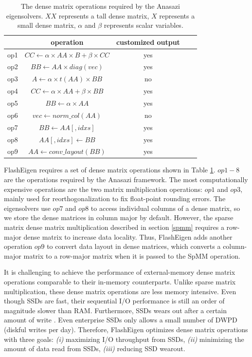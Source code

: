 \begin{table}
	\begin{center}
		\small
		\begin{tabular}{|c|c|c|c|c|}
			\hline
			& operation & customized output \\
			\hline
			op1 & $CC \leftarrow \alpha \times AA \times B + \beta \times CC$ & yes \\
			\hline
			op2 & $BB \leftarrow AA \times diag(vec)$ & yes \\
			\hline
			op3 & $A \leftarrow \alpha \times t(AA) \times BB$ & no \\
			\hline
			op4 & $CC \leftarrow \alpha \times AA + \beta \times BB$ & yes \\
			\hline
			op5 & $BB \leftarrow \alpha \times AA$ & yes \\
			\hline
			op6 & $vec \leftarrow norm\_col(AA)$ & no \\
			\hline
			op7 & $BB \leftarrow AA[,idxs]$ & yes \\
			\hline
			op8 & $AA[,idxs] \leftarrow BB$ & yes \\
			\hline
			op9 & $AA \leftarrow conv\_layout(BB)$ & yes \\
			\hline
		\end{tabular}
		\normalsize
	\end{center}
	\caption{The dense matrix operations required by the Anasazi eigensolvers.
		$XX$ represents a tall dense matrix, $X$ represents a small dense matrix,
	$\alpha$ and $\beta$ represents scalar variables.}
	\label{anasazi_ops}
\end{table}

FlashEigen requires a set of dense matrix operations shown in Table
\ref{anasazi_ops}. $op1-8$ are the operations required by the Anasazi
framework. The most computationally expensive operations are the two
matrix multiplication operations: $op1$ and $op3$, mainly used for
reorthogonalization to fix float-point rounding errors. The eigensolvers
use $op7$ and $op8$ to access individual columns of a dense matrix,
so we store the dense matrices in column major by default.
However, the sparse matrix dense matrix multiplication described in section
\ref{spmm} requires a row-major dense matrix to increase data locality.
Thus, FlashEigen adds another operation $op9$ to convert data layout
in dense matrices, which converts a column-major matrix to a row-major
matrix when it is passed to the SpMM operation.

It is challenging to achieve the performance of external-memory dense matrix
operations comparable to their in-memory counterparts. Unlike sparse matrix
multiplication, these dense matrix operations are less memory intensive.
Even though SSDs are fast, their sequential I/O performance is still an order
of magnitude slower than RAM.
Furthermore, SSDs wears out after a certain amount of write \cite{}.
Even enterprise SSDs \cite{} only allows a small number of DWPD
(diskful writes per day). Therefore, FlashEigen optimizes dense matrix operations
with three goals: \textit{(i)} maximizing I/O throughput from SSDs,
\textit{(ii)} minimizing the amount of data read from SSDs,
\textit{(iii)} reducing SSD wearout.

